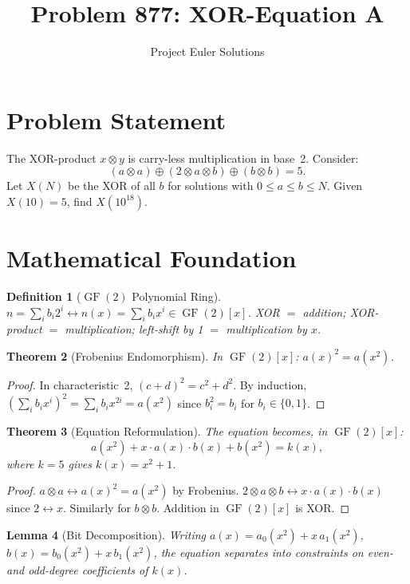 \documentclass[11pt]{article}
\title{Problem 877: XOR-Equation A}
\author{Project Euler Solutions}
\date{}
\newtheorem{theorem}{Theorem}
\newtheorem{lemma}[theorem]{Lemma}
\newtheorem{definition}[theorem]{Definition}
\begin{document}
\maketitle

\section{Problem Statement}

The XOR-product $x \otimes y$ is carry-less multiplication in base~2. Consider:
\[
(a \otimes a) \oplus (2 \otimes a \otimes b) \oplus (b \otimes b) = 5.
\]
Let $X(N)$ be the XOR of all $b$ for solutions with $0 \le a \le b \le N$. Given $X(10)=5$, find $X(10^{18})$.

\section{Mathematical Foundation}

\begin{definition}[$\operatorname{GF}(2)$ Polynomial Ring]
$n = \sum_i b_i 2^i \longleftrightarrow n(x) = \sum_i b_i x^i \in \operatorname{GF}(2)[x]$. XOR $=$ addition; XOR-product $=$ multiplication; left-shift by 1 $=$ multiplication by $x$.
\end{definition}

\begin{theorem}[Frobenius Endomorphism]
In $\operatorname{GF}(2)[x]$: $a(x)^2 = a(x^2)$.
\end{theorem}

\begin{proof}
In characteristic~2, $(c+d)^2 = c^2+d^2$. By induction, $(\sum_i b_i x^i)^2 = \sum_i b_i x^{2i} = a(x^2)$ since $b_i^2 = b_i$ for $b_i \in \{0,1\}$.
\end{proof}

\begin{theorem}[Equation Reformulation]
The equation becomes, in $\operatorname{GF}(2)[x]$:
\[
a(x^2) + x \cdot a(x) \cdot b(x) + b(x^2) = k(x),
\]
where $k=5$ gives $k(x) = x^2 + 1$.
\end{theorem}

\begin{proof}
$a \otimes a \leftrightarrow a(x)^2 = a(x^2)$ by Frobenius. $2 \otimes a \otimes b \leftrightarrow x \cdot a(x) \cdot b(x)$ since $2 \leftrightarrow x$. Similarly for $b \otimes b$. Addition in $\operatorname{GF}(2)[x]$ is XOR.
\end{proof}

\begin{lemma}[Bit Decomposition]
Writing $a(x) = a_0(x^2) + x\,a_1(x^2)$, $b(x) = b_0(x^2) + x\,b_1(x^2)$, the equation separates into constraints on even- and odd-degree coefficients of $k(x)$.
\end{lemma}
\end{document}

